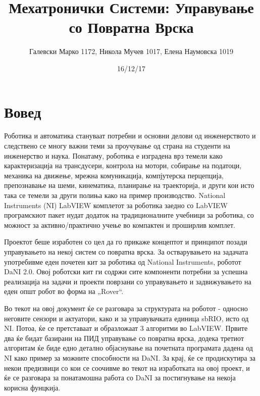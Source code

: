 \documentclass{article}
\title{Мехатронички Системи: Управување со Повратна Врска}
\date{16/12/17}
\author{Галевски Марко 1172, Никола Мучев 1017, Елена Наумовска 1019}
\begin{document}
    \maketitle{}
    \newpage
    \tableofcontents
    \newpage

\section{Вовед}
Роботика и автоматика стануваат потребни и основни делови од инженерството и следствено се многу важни теми за проучување од страна на студенти на инженерство и наука. Понатаму, роботика е изградена врз темели како карактеризација на трансдусери, контрола на мотори, собирање на податоци, механика на движење, мрежна комуникација, компјутерска перцепција, препознавање на шеми, кинематика, планирање на траекторија, и други кои исто така се темели за други полиња како на пример производство. National Instruments (NI) LabVIEW комплетот за роботика заедно со LabVIEW програмскиот пакет нудат додаток на традиционалните учебници за роботика, со можност за активно/практично учење во компактен и проширлив комплет.


Проектот беше изработен со цел да го прикаже концептот и принципот позади управувањето на некој систем со повратна врска. За остварувањето на задачата употребивме еден почетен кит за роботика од National Instruments, роботот DaNI 2.0. Овој роботски кит ги содржи сите компоненти потребни за успешна реализација на задачи и проекти поврзани со управувањето и задвижувањето на еден општ робот во форма на „Rover“. 

Во текот на овој документ ќе се разговара за структурата на роботот - односно неговите сензори и актуатори, како и за управувачката единица sbRIO, исто од NI. Потоа, ќе се претставаат и образложаат 3 алгоритми во LabVIEW. Првите два ќе бидат базирани на ПИД управување со повратна врска, додека третиот алгоритам ќе биде едно детално објаснување на почетната програмата дадена од NI како пример за можните способности на DaNI. За крај, ќе се продискутира за некои предизвици со кои се соочивме во текот на изработката на овој проект, и ќе се разговара за понатамошна работа со DaNI за постигнување на некоја корисна фунцкија.
\end{document}

